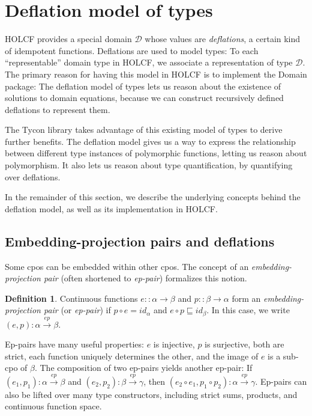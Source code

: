\documentclass{sigplanconf}
\newcommand{\D}{\ensuremath{\mathcal{D}}}
\newcommand{\below}{\sqsubseteq}
\newcommand{\hsc}[1]{\ensuremath{\mathit{#1}}}
\newcommand{\hsid}{\hsc{id}}
\newcommand{\tA}{\alpha}
\newcommand{\tB}{\beta}
\newcommand{\tC}{\gamma}
\newcommand{\eppair}{\stackrel{ep}{\to}}
\theoremstyle{definition}
\newtheorem{definition}{Definition}
\begin{document}
\section{Deflation model of types}
\label{sec:deflation-model}

HOLCF provides a special domain $\D$ whose values are \emph{deflations}, a certain kind of idempotent functions. Deflations are used to model types: To each ``representable'' domain type in HOLCF, we associate a representation of type $\D$. The primary reason for having this model in HOLCF is to implement the Domain package: The deflation model of types lets us reason about the existence of solutions to domain equations, because we can construct recursively defined deflations to represent them.

The Tycon library takes advantage of this existing model of types to derive further benefits. The deflation model gives us a way to express the relationship between different type instances of polymorphic functions, letting us reason about polymorphism. It also lets us reason about type quantification, by quantifying over deflations.

In the remainder of this section, we describe the underlying concepts behind the deflation model, as well as its implementation in HOLCF.

\subsection{Embedding-projection pairs and deflations}

Some cpos can be embedded within other cpos. The concept of an \emph{embedding-projection pair} (often shortened to \emph{ep-pair}) formalizes this notion.
\begin{definition}
Continuous functions $e :: \tA\to\tB$ and $p :: \tB\to\tA$ form an \emph{embedding-projection pair} (or \emph{ep-pair}) if $p \circ e = \hsc{id}_\tA$ and $e \circ p \below \hsid_\tB$. In this case, we write $(e, p) : \tA \eppair \tB$.
\end{definition}

Ep-pairs have many useful properties: $e$ is injective, $p$ is surjective, both are strict, each function uniquely determines the other, and the image of $e$ is a sub-cpo of $\tB$. The composition of two ep-pairs yields another ep-pair: If $(e_1, p_1) : \tA \eppair \tB$ and $(e_2, p_2) : \tB \eppair \tC$, then $(e_2 \circ e_1, p_1 \circ p_2) : \tA \eppair \tC$. Ep-pairs can also be lifted over many type constructors, including strict sums, products, and continuous function space.
\end{document}
